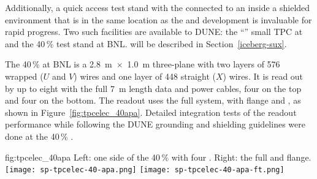 Additionally, a quick access test stand with the  connected to an  inside a shielded 
environment that is in the same location as the  and  development is invaluable 
for rapid progress.  Two such facilities are available to DUNE: the ``'' small TPC at \fnal and the 
\num{40}\,\%  test stand at BNL.  will be described in Section~\ref{iceberg-sux}.

The \num{40}\,\%  at BNL is a \SI{2.8}{m}~$\times$~\SI{1.0}{m} three-plane  with two 
layers of \num{576} wrapped ($U$ and $V$) wires and one layer of \num{448} straight ($X$) wires. It is read 
out by up to eight  with the full \SI{7}{m}  length data and  power cables, 
four on the top and four on the bottom. The readout uses the full  system, with  flange 
and , as shown in Figure~\ref{fig:tpcelec_40apa}. Detailed integration tests of the 
 readout performance while following the DUNE grounding and shielding guidelines were done at the 
\num{40}\,\% .

\begin{dunefigure}
{fig:tpcelec_40apa}
{Left: one side of the \num{40}\,\%  with four .  Right: the full  \fdth and flange.}
\texttt{[image: sp-tpcelec-40-apa.png]}
\hspace{3mm}
\texttt{[image: sp-tpcelec-40-apa-ft.png]}
\end{dunefigure}




